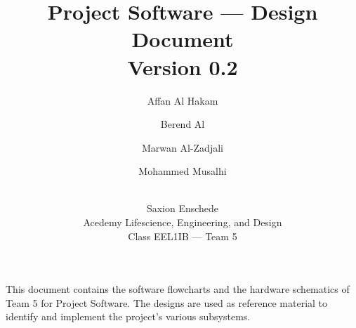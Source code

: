 \documentclass[oneside,a4paper,11pt,titlepage,openany]{report}
\author{
Affan Al Hakam \and 
Berend Al \and
Marwan Al-Zadjali \and
Mohammed Musalhi \and
\\
Saxion Enschede \\
Acedemy Lifescience, Engineering, and Design \\
Class EEL1IB --- Team 5
}
\title{Project Software --- Design Document\\\normalsize Version 0.2}
\begin{document}
\maketitle

\abstract
This document contains the software flowcharts and the hardware schematics of Team 5 for Project Software.
The designs are used as reference material to identify and implement the project's various subsystems.
\end{document}
